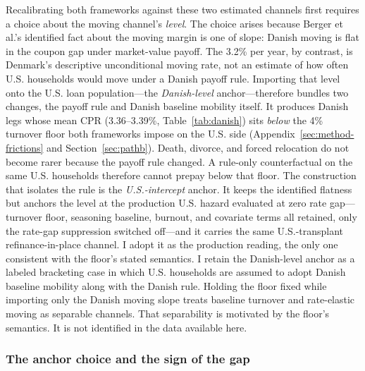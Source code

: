 \documentclass[12pt]{article}
\begin{document}
Recalibrating both frameworks against these two estimated channels first requires a choice about the moving channel's \emph{level}. The choice arises because Berger et al.'s identified fact about the moving margin is one of slope: Danish moving is flat in the coupon gap under market-value payoff. The 3.2\% per year, by contrast, is Denmark's descriptive unconditional moving rate, not an estimate of how often U.S. households would move under a Danish payoff rule. Importing that level onto the U.S. loan population---the \emph{Danish-level} anchor---therefore bundles two changes, the payoff rule and Danish baseline mobility itself. It produces Danish legs whose mean CPR (3.36--3.39\%, Table~\ref{tab:danish}) sits \emph{below} the 4\% turnover floor both frameworks impose on the U.S. side (Appendix~\ref{sec:method-frictions} and Section~\ref{sec:pathb}). Death, divorce, and forced relocation do not become rarer because the payoff rule changed. A rule-only counterfactual on the same U.S. households therefore cannot prepay below that floor. The construction that isolates the rule is the \emph{U.S.-intercept} anchor. It keeps the identified flatness but anchors the level at the production U.S. hazard evaluated at zero rate gap---turnover floor, seasoning baseline, burnout, and covariate terms all retained, only the rate-gap suppression switched off---and it carries the same U.S.-transplant refinance-in-place channel. I adopt it as the production reading, the only one consistent with the floor's stated semantics. I retain the Danish-level anchor as a labeled bracketing case in which U.S. households are assumed to adopt Danish baseline mobility along with the Danish rule. Holding the floor fixed while importing only the Danish moving slope treats baseline turnover and rate-elastic moving as separable channels. That separability is motivated by the floor's semantics. It is not identified in the data available here.

\subsubsection{The anchor choice and the sign of the gap}
\end{document}
